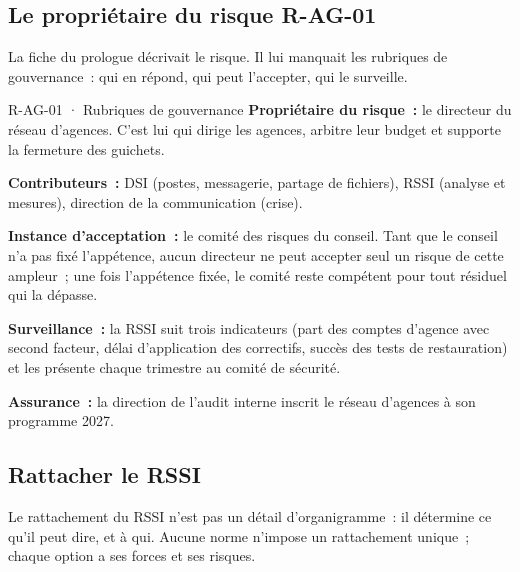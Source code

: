 \subsection{Le propriétaire du risque R-AG-01}

La fiche du prologue décrivait le risque. Il lui manquait les rubriques de
gouvernance~: qui en répond, qui peut l'accepter, qui le surveille.

\begin{boxobjet}{R-AG-01 · Rubriques de gouvernance}
\textbf{Propriétaire du risque~:} le directeur du réseau d'agences. C'est
lui qui dirige les agences, arbitre leur budget et supporte la fermeture
des guichets.

\textbf{Contributeurs~:} DSI (postes, messagerie, partage de fichiers),
RSSI (analyse et mesures), direction de la communication (crise).

\textbf{Instance d'acceptation~:} le comité des risques du conseil. Tant
que le conseil n'a pas fixé l'appétence, aucun directeur ne peut accepter
seul un risque de cette ampleur~; une fois l'appétence fixée, le comité
reste compétent pour tout résiduel qui la dépasse.

\textbf{Surveillance~:} la RSSI suit trois indicateurs (part des comptes
d'agence avec second facteur, délai d'application des correctifs, succès
des tests de restauration) et les présente chaque trimestre au comité de
sécurité.

\textbf{Assurance~:} la direction de l'audit interne inscrit le réseau
d'agences à son programme 2027.
\end{boxobjet}

\subsection{Rattacher le RSSI}

Le rattachement du RSSI n'est pas un détail d'organigramme~: il détermine
ce qu'il peut dire, et à qui. Aucune norme n'impose un rattachement
unique~; chaque option a ses forces et ses risques.


